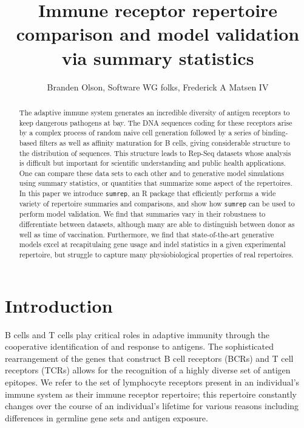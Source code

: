 \documentclass{article}
\title{Immune receptor repertoire comparison and model validation via summary statistics}
\author{Branden Olson, Software WG folks, Frederick A Matsen IV}
\begin{document}
\maketitle

\begin{abstract}
The adaptive immune system generates an incredible diversity of antigen receptors to keep dangerous pathogens at bay.
The DNA sequences coding for these receptors arise by a complex process of random naive cell generation followed by a series of binding-based filters as well as affinity maturation for B cells, giving considerable structure to the distribution of sequences.
This structure leads to Rep-Seq datasets whose analysis is difficult but important for scientific understanding and public health applications.
One can compare these data sets to each other and to generative model simulations using summary statistics, or quantities that summarize some aspect of the repertoires.
In this paper we introduce \texttt{sumrep}, an R package that efficiently performs a wide variety of repertoire summaries and comparisons, and show how \texttt{sumrep} can be used to perform model validation.
We find that summaries vary in their robustness to differentiate between datasets, although many are able to distinguish between donor as well as time of vaccination.
Furthermore, we find that state-of-the-art generative models excel at recapitulaing gene usage and indel statistics in a given experimental repertoire, but struggle to capture many physiobiological properties of real repertoires.
\end{abstract}

\section*{Introduction}

B cells and T cells play critical roles in adaptive immunity through the cooperative identification of and response to antigens.
The sophisticated rearrangement of the genes that construct B cell receptors (BCRs) and T cell receptors (TCRs) allows for the recognition of a highly diverse set of antigen epitopes.
We refer to the set of lymphocyte receptors present in an individual's immune system as their immune receptor repertoire; this repertoire constantly changes over the course of an individual's lifetime for various reasons including differences in germline gene sets and antigen exposure.
\end{document}
